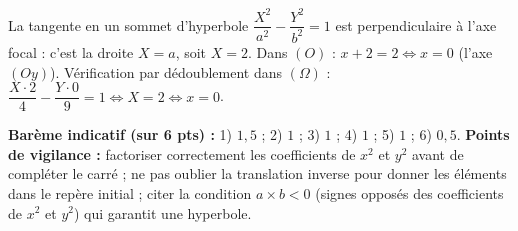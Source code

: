 \documentclass[11pt]{article}
\begin{document}
\begin{corrige}
\begin{enumerate}
  La tangente en un sommet d'hyperbole $\dfrac{X^{2}}{a^{2}} - \dfrac{Y^{2}}{b^{2}} = 1$ est perpendiculaire à l'axe focal : c'est la droite $X = a$, soit $X = 2$.
  Dans $(O)$ : $x + 2 = 2 \iff x = 0$ (l'axe $(Oy)$).
  Vérification par dédoublement dans $(\Omega)$ : $\dfrac{X \cdot 2}{4} - \dfrac{Y \cdot 0}{9} = 1 \iff X = 2 \iff x = 0$.
\end{enumerate}
\textbf{Barème indicatif (sur 6 pts) :} 1) $1,5$ ; 2) $1$ ; 3) $1$ ; 4) $1$ ; 5) $1$ ; 6) $0,5$.
\textbf{Points de vigilance :} factoriser correctement les coefficients de $x^{2}$ et $y^{2}$ avant de compléter le carré ; ne pas oublier la translation inverse pour donner les éléments dans le repère initial ; citer la condition $a \times b < 0$ (signes opposés des coefficients de $x^{2}$ et $y^{2}$) qui garantit une hyperbole.
\end{corrige}
\end{document}
